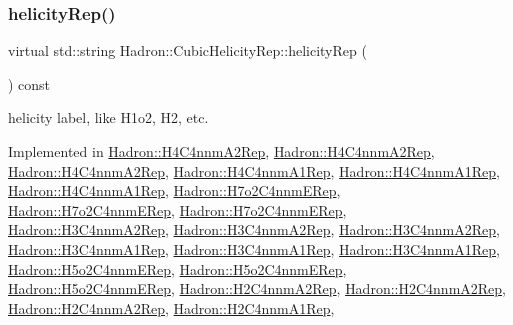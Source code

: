 \subsubsection{\texorpdfstring{helicityRep()}{helicityRep()}\hspace{0.1cm}{\footnotesize\ttfamily [1/3]}}
{\footnotesize\ttfamily virtual std\+::string Hadron\+::\+Cubic\+Helicity\+Rep\+::helicity\+Rep (\begin{DoxyParamCaption}{ }\end{DoxyParamCaption}) const\hspace{0.3cm}{\ttfamily [pure virtual]}}

helicity label, like H1o2, H2, etc. 

Implemented in \mbox{\hyperlink{structHadron_1_1H4C4nnmA2Rep_a22ac4fc575c83f59d3df9d247a6523a8}{Hadron\+::\+H4\+C4nnm\+A2\+Rep}}, \mbox{\hyperlink{structHadron_1_1H4C4nnmA2Rep_a22ac4fc575c83f59d3df9d247a6523a8}{Hadron\+::\+H4\+C4nnm\+A2\+Rep}}, \mbox{\hyperlink{structHadron_1_1H4C4nnmA2Rep_a22ac4fc575c83f59d3df9d247a6523a8}{Hadron\+::\+H4\+C4nnm\+A2\+Rep}}, \mbox{\hyperlink{structHadron_1_1H4C4nnmA1Rep_a9693ffed8dcfde2846c4cf56c107f88c}{Hadron\+::\+H4\+C4nnm\+A1\+Rep}}, \mbox{\hyperlink{structHadron_1_1H4C4nnmA1Rep_a9693ffed8dcfde2846c4cf56c107f88c}{Hadron\+::\+H4\+C4nnm\+A1\+Rep}}, \mbox{\hyperlink{structHadron_1_1H4C4nnmA1Rep_a9693ffed8dcfde2846c4cf56c107f88c}{Hadron\+::\+H4\+C4nnm\+A1\+Rep}}, \mbox{\hyperlink{structHadron_1_1H7o2C4nnmERep_ab9cdc1b5f216f5ac06995e9405037509}{Hadron\+::\+H7o2\+C4nnm\+E\+Rep}}, \mbox{\hyperlink{structHadron_1_1H7o2C4nnmERep_ab9cdc1b5f216f5ac06995e9405037509}{Hadron\+::\+H7o2\+C4nnm\+E\+Rep}}, \mbox{\hyperlink{structHadron_1_1H7o2C4nnmERep_ab9cdc1b5f216f5ac06995e9405037509}{Hadron\+::\+H7o2\+C4nnm\+E\+Rep}}, \mbox{\hyperlink{structHadron_1_1H3C4nnmA2Rep_acabc462818e030ca95a03f9ecf996e35}{Hadron\+::\+H3\+C4nnm\+A2\+Rep}}, \mbox{\hyperlink{structHadron_1_1H3C4nnmA2Rep_acabc462818e030ca95a03f9ecf996e35}{Hadron\+::\+H3\+C4nnm\+A2\+Rep}}, \mbox{\hyperlink{structHadron_1_1H3C4nnmA2Rep_acabc462818e030ca95a03f9ecf996e35}{Hadron\+::\+H3\+C4nnm\+A2\+Rep}}, \mbox{\hyperlink{structHadron_1_1H3C4nnmA1Rep_a0bd69f3a04496d18380f553e0fea11b0}{Hadron\+::\+H3\+C4nnm\+A1\+Rep}}, \mbox{\hyperlink{structHadron_1_1H3C4nnmA1Rep_a0bd69f3a04496d18380f553e0fea11b0}{Hadron\+::\+H3\+C4nnm\+A1\+Rep}}, \mbox{\hyperlink{structHadron_1_1H3C4nnmA1Rep_a0bd69f3a04496d18380f553e0fea11b0}{Hadron\+::\+H3\+C4nnm\+A1\+Rep}}, \mbox{\hyperlink{structHadron_1_1H5o2C4nnmERep_acfb835153b5bdf1afdc5c7775912e546}{Hadron\+::\+H5o2\+C4nnm\+E\+Rep}}, \mbox{\hyperlink{structHadron_1_1H5o2C4nnmERep_acfb835153b5bdf1afdc5c7775912e546}{Hadron\+::\+H5o2\+C4nnm\+E\+Rep}}, \mbox{\hyperlink{structHadron_1_1H5o2C4nnmERep_acfb835153b5bdf1afdc5c7775912e546}{Hadron\+::\+H5o2\+C4nnm\+E\+Rep}}, \mbox{\hyperlink{structHadron_1_1H2C4nnmA2Rep_a6f9741481d738e4bf6b7b5f035dac13c}{Hadron\+::\+H2\+C4nnm\+A2\+Rep}}, \mbox{\hyperlink{structHadron_1_1H2C4nnmA2Rep_a6f9741481d738e4bf6b7b5f035dac13c}{Hadron\+::\+H2\+C4nnm\+A2\+Rep}}, \mbox{\hyperlink{structHadron_1_1H2C4nnmA2Rep_a6f9741481d738e4bf6b7b5f035dac13c}{Hadron\+::\+H2\+C4nnm\+A2\+Rep}}, \mbox{\hyperlink{structHadron_1_1H2C4nnmA1Rep_a383c3c921c06e12e6ad53f2acb09bda1}{Hadron\+::\+H2\+C4nnm\+A1\+Rep}}, 